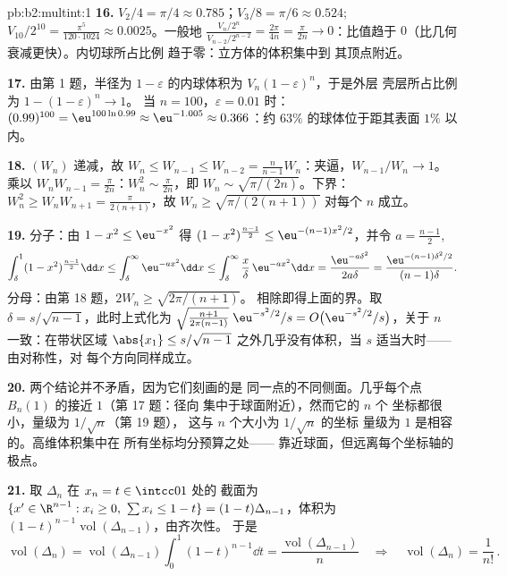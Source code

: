 \begin{solution}{pb:b2:multint:1}
\textbf{16.} $V_2/4 = \pi/4 \approx 0.785$；$V_3/8 = \pi/6
\approx 0.524$; $V_{10}/2^{10} = \frac{\pi^5}{120\cdot1024}
\approx 0.0025$。一般地 $\frac{V_n/2^n}{V_{n-2}/2^{n-2}}
= \frac{2\pi}{4n} = \frac{\pi}{2n} \to 0$：比值趋于
$0$（比几何衰减更快）。内切球所占比例
趋于零：立方体的体积集中到
其顶点附近。

\textbf{17.} 由第 1 题，半径为 $1 -
\varepsilon$ 的内球体积为 $V_n(1-\varepsilon)^n$，于是外层
壳层所占比例为 $1 - (1 - \varepsilon)^n \to 1$。
当 $n = 100$，$\varepsilon = 0.01$ 时：$(0.99)^{100} =
\eu^{100\ln0.99} \approx \eu^{-1.005} \approx 0.366$：约
$63\%$ 的球体位于距其表面 $1\%$ 以内。

\textbf{18.} $(W_n)$ 递减，故 $W_n \leq W_{n-1} \leq
W_{n-2} = \frac{n}{n-1}W_n$：夹逼，$W_{n-1}/W_n \to 1$。
乘以 $W_nW_{n-1} = \frac\pi{2n}$：$W_n^2 \sim
\frac\pi{2n}$，即 $W_n \sim \sqrt{\pi/(2n)}$。下界：
$W_n^2 \geq W_nW_{n+1} = \frac{\pi}{2(n+1)}$，故 $W_n \geq
\sqrt{\pi/(2(n+1))}$ 对每个 $n$ 成立。

\textbf{19.} 分子：由 $1 - x^2 \leq \eu^{-x^2}$ 得 $(1 -
x^2)^{\frac{n-1}2} \leq \eu^{-(n-1)x^2/2}$，并令 $a =
\frac{n-1}2$,
\[
\int_\delta^1(1 - x^2)^{\frac{n-1}2}\dd x
\leq \int_\delta^\infty\eu^{-ax^2}\dd x
\leq \int_\delta^\infty\frac x\delta\,\eu^{-ax^2}\dd x
= \frac{\eu^{-a\delta^2}}{2a\delta}
= \frac{\eu^{-(n-1)\delta^2/2}}{(n-1)\delta}.
\]
分母：由第 18 题，$2W_n \geq \sqrt{2\pi/(n+1)}$。
相除即得上面的界。取 $\delta =
s/\sqrt{n-1}$，此时上式化为
$\sqrt{\tfrac{n+1}{2\pi(n-1)}}\;\eu^{-s^2/2}/s = O\bigl(
\eu^{-s^2/2}/s\bigr)$，关于 $n$ 一致：在带状区域
$\abs{x_1} \leq s/\sqrt{n-1}$ 之外几乎没有体积，当
$s$ 适当大时——由对称性，对
每个方向同样成立。

\textbf{20.} 两个结论并不矛盾，因为它们刻画的是
同一点的不同侧面。几乎每个点
$B_n(1)$ 的接近 $1$（第 17 题：径向
集中于球面附近），然而它的 $n$ 个
坐标都很小，量级为 $1/\sqrt n$（第 19 题），
这与 $n$ 个大小为 $1/\sqrt n$ 的坐标
量级为 $1$ 是相容的。高维体积集中在
所有坐标均分预算之处——
靠近球面，但远离每个坐标轴的极点。

\textbf{21.} 取 $\Delta_n$ 在 $x_n = t \in \intcc01$ 处的
截面为 $\{x' \in \R^{n-1} : x_i \geq 0,\ \sum x_i \leq 1 -
t\} = (1-t)\Delta_{n-1}$，体积为
$(1-t)^{n-1}\operatorname{vol}(\Delta_{n-1})$，由齐次性。
于是
\[
\operatorname{vol}(\Delta_n) =
\operatorname{vol}(\Delta_{n-1})\int_0^1(1 - t)^{n-1}\dd t =
\frac{\operatorname{vol}(\Delta_{n-1})}{n}
\quad\Longrightarrow\quad
\operatorname{vol}(\Delta_n) = \frac1{n!}\,.
\]


\end{solution}
